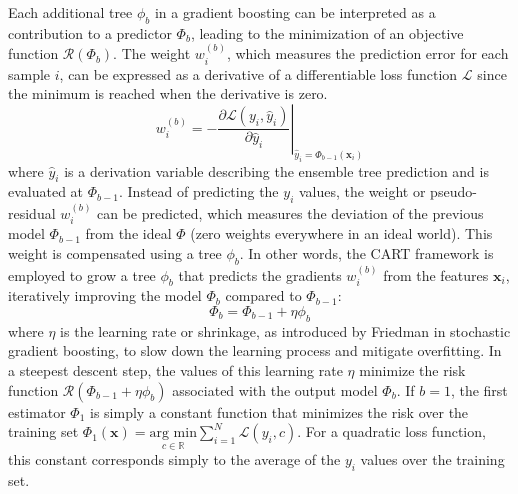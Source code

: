 \documentclass[main]{subfiles}
\begin{document}
Each additional tree $\phi_{b}$ in a gradient boosting can be interpreted as a contribution to a predictor $\Phi_{b}$, leading to the minimization of an objective function $\mathcal{R}(\Phi_{b})$. The weight $w_i^{(b)}$, which measures the prediction error for each sample $i$, can be expressed as a derivative of a differentiable loss function $\mathcal{L}$ since the minimum is reached when the derivative is zero. 
\begin{equation}
  w_i^{(b)} = -\left.\frac{\partial\mathcal{L}\left(y_i,\hat{y}_i\right)}{\partial\hat{y}_i}\right|_{\hat{y}_i=\Phi_{b-1}(\mathbf{x}_i)}
\end{equation}
where $\hat{y}_i$ is a derivation variable describing the ensemble tree prediction and is evaluated at $\Phi_{b-1}$. Instead of predicting the $y_i$ values, the weight or pseudo-residual $w_i^{(b)}$ can be predicted, which measures the deviation of the previous model $\Phi_{b-1}$ from the ideal $\Phi$ (zero weights everywhere in an ideal world). This weight is compensated using a tree $\phi_{b}$. In other words, the CART framework is employed to grow a tree $\phi_{b}$ that predicts the gradients $w_i^{(b)}$ from the features $\mathbf{x}_i$, iteratively improving the model $\Phi_b$ compared to $\Phi_{b-1}$: 
\begin{equation}
  \Phi_b = \Phi_{b-1} + \eta \phi_{b}
\end{equation}
where $\eta$ is the learning rate or shrinkage, as introduced by Friedman in stochastic gradient boosting, to slow down the learning process and mitigate overfitting.\autocite{Friedman2002} In a steepest descent step, the values of this learning rate $\eta$ minimize the risk function $\mathcal{R}(\Phi_{b-1} + \eta \phi_{b})$ associated with the output model $\Phi_b$. If $b=1$, the first estimator $\Phi_1$ is simply a constant function that minimizes the risk over the training set $\Phi_1(\mathbf{x}) = \underset{c\in \mathbb{R}}{\text{arg min}} \sum_{i=1}^{N}\mathcal{L}(y_i,c)$. For a quadratic loss function, this constant corresponds simply to the average of the $y_i$ values over the training set.
\end{document}
